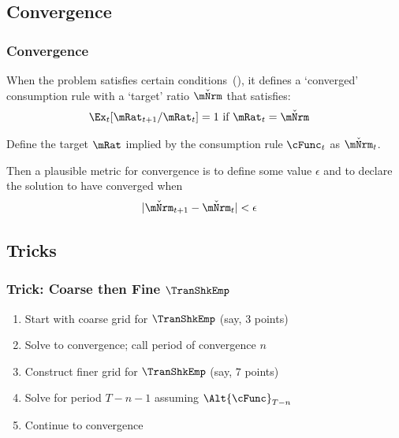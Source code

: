 \documentclass{beamer}
\begin{document}
\subsection{Convergence}
\begin{frame}
\frametitle{Convergence}

When the problem satisfies certain conditions~(\cite{BufferStockTheory}),
it defines a `converged' consumption rule with a `target' ratio $\check{\mNrm}$
that satisfies:
\begin{equation}\begin{gathered}\begin{aligned}
  \Ex_{t}[\mRat_{t+1}/\mRat_{t}]  & = 1 \text{~if $\mRat_{t} = \check{\mNrm}$}
\end{aligned}\end{gathered}\end{equation}

\pause 

Define the target $\mRat$ implied by the consumption rule $\cFunc_{t}$ as $\check{\mNrm}_{t}$.

\medskip\pause
Then a plausible metric for convergence is to define some value $\epsilon$ and to declare
the solution to have converged when
\begin{equation}\begin{gathered}\begin{aligned}
  |\check{\mNrm}_{t+1}-\check{\mNrm}_{t}|  & < \epsilon
\end{aligned}\end{gathered}\end{equation}

\end{frame}

\subsection{Tricks}
\begin{frame}
\frametitle{Trick: Coarse then Fine $\TranShkEmp$}

\begin{enumerate}
\item Start with coarse grid for $\TranShkEmp$ (say, 3 points)
\item Solve to convergence; call period of convergence $n$
\item Construct finer grid for $\TranShkEmp$ (say, 7 points)
\item Solve for period $T-n-1$ assuming $\Alt{\cFunc}_{T-n}$ 
\item Continue to convergence
\end{enumerate}

\end{frame}
\end{document}
